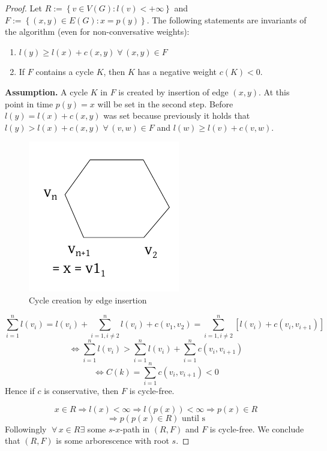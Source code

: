 \documentclass[a4paper]{article}
\theoremstyle{definition}
\newcommand{\set}[1]{\left\{#1\right\}}
\newcommand{\gath}[2]{$#1$-$#2$-path} %
\newcommand{\fall}{\;\forall\,}
\begin{document}
\begin{proof}
  Let $R := \set{v \in V(G): l(v) < +\infty}$ and $F := \set{(x, y) \in E(G): x = p(y)}$.
  The following statements are invariants of the algorithm (even for non-conversative weights):
  \begin{enumerate}
    \item $l(y) \geq l(x) + c(x, y) \fall (x, y) \in F$
    \item If $F$ contains a cycle $K$, then $K$ has a negative weight $c(K) < 0$.
  \end{enumerate}

  \textbf{Assumption.}
    A cycle $K$ in $F$ is created by insertion of edge $(x, y)$. At this point in time $p(y) = x$ will be set in the second step. Before $l(y) = l(x) + c(x, y)$ was set because previously it holds that $l(y) > l(x) + c(x, y) \fall (v, w) \in F$ and $l(w) \geq l(v) + c(v, w)$.
  \begin{figure}[!ht]
    \begin{center}
      \includegraphics{img/cycle.pdf}
      \caption{Cycle creation by edge insertion}
    \end{center}
  \end{figure}
  \[
    \sum_{i=1}^{n} l(v_i) = l(v_i) + \sum_{i=1, i\neq2}^n l(v_i) + c(v_1, v_2) = \sum_{i=1,i\neq2}^n [l(v_i) + c(v_i, v_{i+1})]
  \] \[
    \Leftrightarrow \sum_{i=1}^n l(v_i) > \sum_{i=1}^n l(v_i) + \sum_{i=1}^n c(v_i, v_{i+1})
  \] \[
    \Leftrightarrow C(k) = \sum_{i=1}^n c(v_i, v_{i+1}) < 0
  \]
  Hence if $c$ is conservative, then $F$ is cycle-free.

  \[
    x \in R \Rightarrow l(x) < \infty \Rightarrow l(p(x)) < \infty \Rightarrow p(x) \in R
  \] \[
    \Rightarrow p(p(x) \in R) \text{ until s}
  \]
  Followingly $\fall x \in R \exists$ some \gath sx in $(R, F)$ and $F$ is cycle-free. We conclude that $(R, F)$ is some arborescence  with root $s$.


\end{proof}
\end{document}
